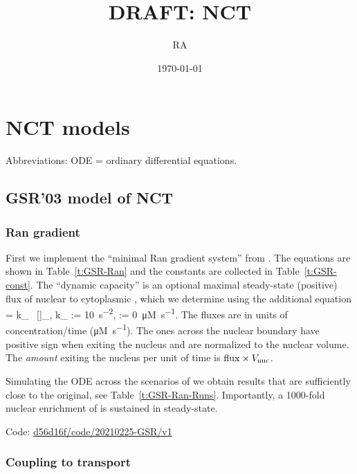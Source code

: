 \documentclass[12pt,notitlepage]{article}
\title{DRAFT: NCT}
\author{RA}
\date{\today}
\renewcommand{\d}{\mathrm{d}}
\newcommand{\ddt}{\frac{\d}{\d{t}}}
\newcommand{\TEXT}[1]{\quad\text{#1}\quad}
\def\[#1\]{\begin{align}#1\end{align}}
\begin{document}
\maketitle

\section{NCT models}

Abbreviations:
ODE = ordinary differential equations.

\subsection{GSR'03 model of NCT} \label{s:GSR03}

\subsubsection*{Ran gradient} \label{s:GSR03:Ran}

First we implement
the ``minimal Ran gradient system'' from 
\cite{GoerlichSeewaldRibbeck2003}.
%
%
The equations are shown in
Table~\ref{t:GSR-Ran}
and
the constants are collected in 
Table~\ref{t:GSR-const}.
%
%
The ``dynamic capacity'' 
is an optional maximal steady-state (positive) flux
of nuclear  to cytoplasmic ,
which we determine using the additional equation
\[
	\label{e:Ex}
	\ddt {}
	=
	k_{} \, []_,
	\quad
	k_{} := \SI{10}{s^{-2}},
	\TEXT{initial}
	 := \SI{0}{\micro M . s^{-1}}.
\]
%
%
The fluxes 
are in units of concentration/time (\si{\micro M . s^{-1}}).
%
The ones across the nuclear boundary
have positive sign when exiting the nucleus
and are normalized to the nuclear volume.
%
The \emph{amount} exiting the nucleus per unit of time is
$\ce{flux} \times V_\text{nuc}$.

%

Simulating the ODE
across the scenarios of 
\cite{GoerlichSeewaldRibbeck2003}
we obtain 
results that are sufficiently close
to the original,
see Table~\ref{t:GSR-Ran-Runs}.
%
%
Importantly,
a 1000-fold nuclear enrichment of 
is sustained in steady-state.

%

Code:
\href{https://github.com/numpde/nct1/tree/d56d16f/code/20210225-GSR/v1}{d56d16f/code/20210225-GSR/v1}

%

\subsubsection*{Coupling to transport} \label{s:GSR03:Imp}
\end{document}
